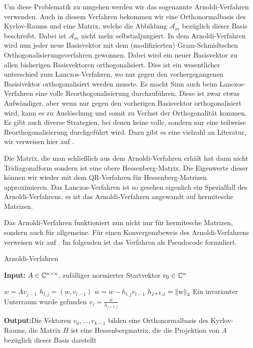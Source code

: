 \documentclass{article}
\theoremstyle{plain}
\begin{document}
Um diese Problematik zu umgehen werden wir das sogenannte Arnoldi-Verfahren verwenden. Auch in diesem Verfahren bekommen wir eine Orthonormalbasis des Kyrlov-Raums und eine Matrix, welche die Abbildung $\mathcal{A}_m$ bezüglich dieser Basis beschreibt. Dabei ist $\mathcal{A}_m$ nicht mehr selbstadjungiert. In dem Arnoldi-Verfahren wird nun jeder neue Basisvektor mit dem (modifizierten) Gram-Schmidtschen Orthogonalisierungsverfahren gewonnen. Dabei wird ein neuer Basisvektor zu allen bisherigen Basisvektoren orthogonalisiert. Dies ist ein wesentlicher unterschied zum Lanczos-Verfahren, wo nur gegen den vorhergegangenen Basisivektor orthogonalisiert werden musste.
Es macht Sinn auch beim Lanczos-Verfahren eine volle Reorthogonalisierung durchzuführen. Diese ist zwar etwas Aufwändiger, aber wenn nur gegen den vorherigen Basisvektor orthogonalisiert wird, kann es zu Auslöschung und somit zu Verlust der Orthogonalität kommen. Es gibt auch diverse Strategien, bei denen keine volle, sondern nur eine teilweise Reorthogonalisierung durchgeführt wird. Dazu gibt es eine vielzahl an Literatur, wir verweisen hier auf \cite{reorthogonalization}.

Die Matrix, die man schließlich aus dem Arnoldi-Verfahren erhält hat dann nicht Tridiagonalform sondern ist eine obere Hessenberg-Matrix. Die Eigenwerte dieser können wir wieder mit dem QR-Verfahren für Hessenberg-Matrizen approximieren.
Das Lanczos-Verfahren ist so gesehen eigenlich ein Spezialfall des Arnoldi-Verfahrens, es ist das Arnoldi-Verfahren angewandt auf hermitesche Matrizen.

Das Arnoldi-Verfahren funktioniert nun nicht nur für hermitesche Matrizen, sondern auch für allgemeine. Für einen Konvergenzbeweis des Arnoldi-Verfahrens verweisen wir auf \cite{Saad_book}. Im folgenden ist das Verfahren als Pseudocode formuliert.

\renewcommand{\algorithmicrequire}{\textbf{Input:}}
\renewcommand{\algorithmicensure}{\textbf{Output:}}

\begin{algorithm}[H]

	\caption{Arnoldi-Verfahren}
	\label{Arnoldi-Verfahren}
	\algorithmicrequire{ $A \in \C^{n\times n}$, zufälliger normierter Startvektor $v_0 \in \C^n$}
	\begin{algorithmic}[1]
			\State $w = A v_{j-1}$
				\State $h_{l,j} = (w, v_{l-1})$
				\State $w = w - h_{l,j}v_{l-1}$
			\EndFor
			\State $h_{j+1,j} = \norm[2]{w}$
			\State Ein invarianter Unterraum wurde gefunden
			\Else
				\State $v_j = \frac{w}{h_{j+1,j}}$
			\EndIf
		\EndFor
	\end{algorithmic}
	\algorithmicensure{Die Vektoren $v_0,\dots,v_{k-1}$ bilden eine Orthonormalbasis des Kyrlov-Raums, die Matrix $H$ ist eine Hessenbergmatrix, die die Projektion von $A$ bezüglich dieser Basis darstellt}
\end{algorithm}
\end{document}
